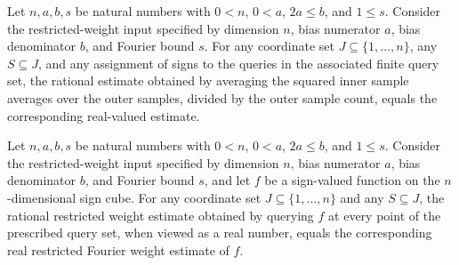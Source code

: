 \begin{theorem}
\label{FABL.rationalRestrictedFourierWeightEstimateFromAnswers_cast}
\leanok
{}
Let $n,a,b,s$ be natural numbers with $0<n$, $0<a$, $2a\le b$, and $1\le s$. Consider
the restricted-weight input specified by dimension $n$, bias numerator $a$, bias
denominator $b$, and Fourier bound $s$. For any coordinate set
$J\subseteq\{1,\ldots,n\}$, any $S\subseteq J$, and any assignment of signs to the
queries in the associated finite query set, the rational estimate obtained by averaging
the squared inner sample averages over the outer samples, divided by the outer sample
count, equals the corresponding real-valued estimate.
\end{theorem}

\begin{theorem}
\label{FABL.rationalRestrictedFourierWeightEstimateFromOracle_cast}
\leanok
{}
Let $n,a,b,s$ be natural numbers with $0<n$, $0<a$, $2a\le b$, and $1\le s$. Consider
the restricted-weight input specified by dimension $n$, bias numerator $a$, bias
denominator $b$, and Fourier bound $s$, and let $f$ be a sign-valued function on the
$n$-dimensional sign cube. For any coordinate set $J\subseteq\{1,\ldots,n\}$ and any
$S\subseteq J$, the rational restricted weight estimate obtained by querying $f$ at
every point of the prescribed query set, when viewed as a real number, equals the
corresponding real restricted Fourier weight estimate of $f$.
\end{theorem}

